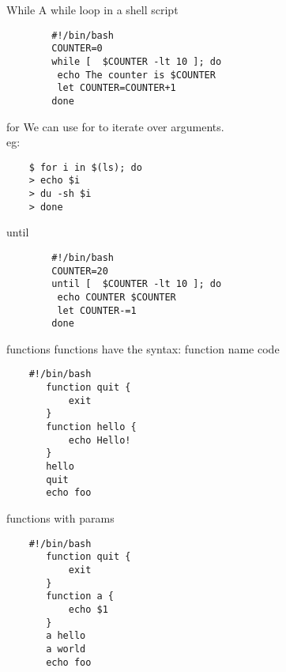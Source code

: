 \documentclass{beamer}
\begin{document}
\begin{frame}[fragile]{While}
A while loop in a shell script
    \begin{verbatim}
        #!/bin/bash 
        COUNTER=0
        while [  $COUNTER -lt 10 ]; do
         echo The counter is $COUNTER
         let COUNTER=COUNTER+1 
        done
    \end{verbatim}
    
\end{frame}

\begin{frame}[fragile]{for}
    We can use for to iterate over arguments.\\
    eg:
    \begin{verbatim}
    $ for i in $(ls); do
    > echo $i
    > du -sh $i
    > done
    \end{verbatim}
\end{frame}

\begin{frame}[fragile]{until}
    \begin{verbatim}
        #!/bin/bash 
        COUNTER=20
        until [  $COUNTER -lt 10 ]; do
         echo COUNTER $COUNTER
         let COUNTER-=1
        done
    \end{verbatim}
\end{frame}
\begin{frame}[fragile]{functions}
    functions have the syntax: function name { code }
    \begin{verbatim}
    #!/bin/bash 
       function quit {
           exit
       }
       function hello {
           echo Hello!
       }
       hello
       quit
       echo foo 
    \end{verbatim}
\end{frame}

\begin{frame}[fragile]{functions with params}
    \begin{verbatim}
    #!/bin/bash 
       function quit {
           exit
       }
       function a {
           echo $1
       }
       a hello
       a world
       echo foo 
    \end{verbatim}
\end{frame}
\end{document}
